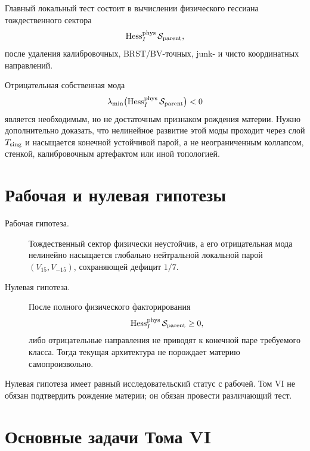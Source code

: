 Главный локальный тест состоит в вычислении физического гессиана
тождественного сектора
\begin{equation}
 \operatorname{Hess}_I^{\rm phys}\mathcal S_{\rm parent},
\end{equation}
после удаления калибровочных, BRST/BV-точных, junk- и чисто координатных
направлений.

Отрицательная собственная мода
\begin{equation}
 \lambda_{\min}
 \bigl(\operatorname{Hess}_I^{\rm phys}\mathcal S_{\rm parent}\bigr)<0
 \label{eq:v6-negative-mode}
\end{equation}
является необходимым, но не достаточным признаком рождения материи. Нужно
дополнительно доказать, что нелинейное развитие этой моды проходит через
слой $T_{\rm sing}$ и насыщается конечной устойчивой парой, а не
неограниченным коллапсом, стенкой, калибровочным артефактом или иной
топологией.

\section{Рабочая и нулевая гипотезы}

\begin{description}
 \item[Рабочая гипотеза.] Тождественный сектор физически неустойчив, а
 его отрицательная мода нелинейно насыщается глобально нейтральной
 локальной парой $(V_{15},V_{-15})$, сохраняющей дефицит $1/7$.

 \item[Нулевая гипотеза.] После полного физического факторирования
 \begin{equation}
  \operatorname{Hess}_I^{\rm phys}\mathcal S_{\rm parent}\geq0,
 \end{equation}
 либо отрицательные направления не приводят к конечной паре требуемого
 класса. Тогда текущая архитектура не порождает материю самопроизвольно.
\end{description}

Нулевая гипотеза имеет равный исследовательский статус с рабочей. Том VI
не обязан подтвердить рождение материи; он обязан провести различающий
тест.

\section{Основные задачи Тома VI}

